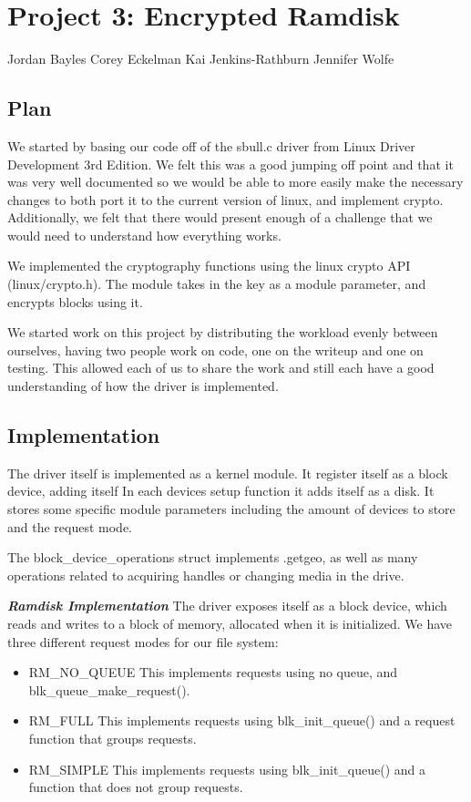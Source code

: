 \documentclass[11pt]{article}
\begin{document}
\section{Project 3: Encrypted Ramdisk}

Jordan Bayles Corey Eckelman Kai Jenkins-Rathburn Jennifer Wolfe

\subsection{Plan}

We started by basing our code off of the sbull.c driver from Linux
Driver Development 3rd Edition. We felt this was a good jumping off
point and that it was very well documented so we would be able to more
easily make the necessary changes to both port it to the current version
of linux, and implement crypto. Additionally, we felt that there would
present enough of a challenge that we would need to understand how
everything works.

We implemented the cryptography functions using the linux crypto API
(linux/crypto.h). The module takes in the key as a module parameter, and
encrypts blocks using it.

We started work on this project by distributing the workload evenly
between ourselves, having two people work on code, one on the writeup
and one on testing. This allowed each of us to share the work and still
each have a good understanding of how the driver is implemented.

\subsection{Implementation}

The driver itself is implemented as a kernel module. It register itself
as a block device, adding itself In each devices setup function it adds
itself as a disk. It stores some specific module parameters including
the amount of devices to store and the request mode.

The block\_device\_operations struct implements .getgeo, as well as many
operations related to acquiring handles or changing media in the drive.

\textbf{\emph{Ramdisk Implementation}} The driver exposes itself as a
block device, which reads and writes to a block of memory, allocated
when it is initialized. We have three different request modes for our
file system: 
\begin{itemize}
\item{RM\_NO\_QUEUE} This implements requests using no queue,
and blk\_queue\_make\_request().  
\item{RM\_FULL} This implements requests
using blk\_init\_queue() and a request function that groups requests. 
\item{RM\_SIMPLE} This implements requests using blk\_init\_queue() and a
function that does not group requests.
\end{itemize}
\end{document}
